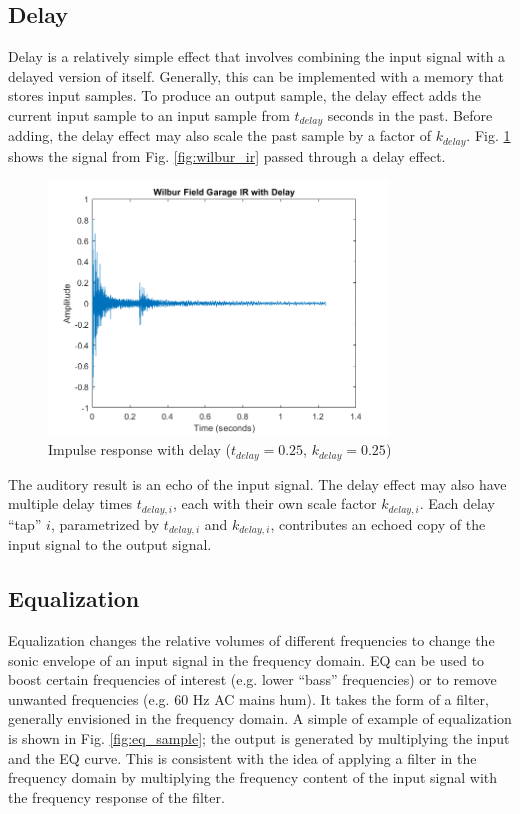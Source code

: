 \documentclass[conference]{IEEEtran}
\begin{document}
\subsection{Delay}

Delay is a relatively simple effect that involves combining the input signal with a delayed version of itself. Generally, this can be implemented with a memory that stores input samples. To produce an output sample, the delay effect adds the current input sample to an input sample from $t_{delay}$ seconds in the past. Before adding, the delay effect may also scale the past sample by a factor of $k_{delay}$. Fig. \ref{fig:wilbur_delay} shows the signal from Fig. \ref{fig:wilbur_ir} passed through a delay effect.

\begin{figure}[htbp]
    \centerline{\includegraphics[width=9cm]{wilbur_delay.png}}
    \caption{Impulse response with delay ($t_{delay} = 0.25$, $k_{delay} = 0.25$)}
    \label{fig:wilbur_delay}
\end{figure}

The auditory result is an echo of the input signal. The delay effect may also have multiple delay times $t_{delay,i}$, each with their own scale factor $k_{delay,i}$. Each delay ``tap'' $i$, parametrized by $t_{delay,i}$ and $k_{delay,i}$, contributes an echoed copy of the input signal to the output signal.


\subsection{Equalization}

Equalization changes the relative volumes of different frequencies to change the sonic envelope of an input signal in the frequency domain. EQ can be used to boost certain frequencies of interest (e.g. lower ``bass'' frequencies) or to remove unwanted frequencies (e.g. 60 Hz AC mains hum). It takes the form of a filter, generally envisioned in the frequency domain. A simple of example of equalization is shown in Fig. \ref{fig:eq_sample}; the output is generated by multiplying the input and the EQ curve. This is consistent with the idea of applying a filter in the frequency domain by multiplying the frequency content of the input signal with the frequency response of the filter.
\end{document}
